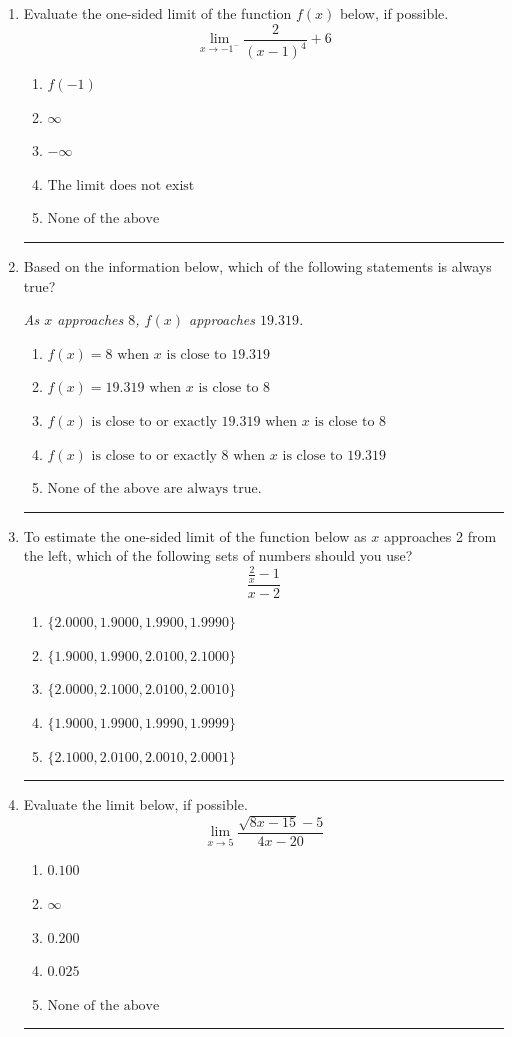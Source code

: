 \documentclass[14pt]{extbook}
\newcommand{\litem}[1]{\item#1\hspace*{-1cm}\rule{\textwidth}{0.4pt}}
\begin{document}
\begin{enumerate}
{\begin{enumerate}[label=\Alph*.]
\end{enumerate} }
\litem{
Evaluate the one-sided limit of the function $f(x)$ below, if possible.\[ \lim_{x \rightarrow -1^-} \frac{2}{(x-1)^4}+6 \]\begin{enumerate}[label=\Alph*.]
\item \( f(-1) \)
\item \( \infty \)
\item \( -\infty \)
\item \( \text{The limit does not exist} \)
\item \( \text{None of the above} \)

\end{enumerate} }
\litem{
Based on the information below, which of the following statements is always true?
\begin{center}
    \textit{ As $x$ approaches $8$, $f(x)$ approaches $19.319$. }
\end{center}
\begin{enumerate}[label=\Alph*.]
\item \( f(x) = 8 \text{ when } x \text{ is close to } 19.319 \)
\item \( f(x) = 19.319 \text{ when } x \text{ is close to } 8 \)
\item \( f(x) \text{ is close to or exactly } 19.319 \text{ when } x \text{ is close to } 8 \)
\item \( f(x) \text{ is close to or exactly } 8 \text{ when } x \text{ is close to } 19.319 \)
\item \( \text{None of the above are always true.} \)

\end{enumerate} }
\litem{
To estimate the one-sided limit of the function below as $x$ approaches 2 from the left, which of the following sets of numbers should you use?\[ \frac{\frac{2}{x} - 1}{x - 2} \]\begin{enumerate}[label=\Alph*.]
\item \( \{ 2.0000, 1.9000, 1.9900, 1.9990 \} \)
\item \( \{ 1.9000, 1.9900, 2.0100, 2.1000 \} \)
\item \( \{ 2.0000, 2.1000, 2.0100, 2.0010 \} \)
\item \( \{ 1.9000, 1.9900, 1.9990, 1.9999 \} \)
\item \( \{ 2.1000, 2.0100, 2.0010, 2.0001 \} \)

\end{enumerate} }
\litem{
Evaluate the limit below, if possible.\[ \lim_{x \rightarrow 5} \frac{\sqrt{8x - 15} - 5}{4x - 20} \]\begin{enumerate}[label=\Alph*.]
\item \( 0.100 \)
\item \( \infty \)
\item \( 0.200 \)
\item \( 0.025 \)
\item \( \text{None of the above} \)

\end{enumerate} }
\end{enumerate}
\end{document}
